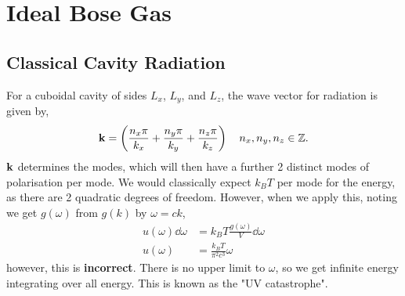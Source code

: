 \documentclass{book}
\begin{document}
\section{Ideal Bose Gas}
\subsection{Classical Cavity Radiation}
For a cuboidal cavity of sides $L_x$, $L_y$, and $L_z$, the wave vector for radiation is given by,
\begin{equation}
	\vb{k} = \left(\frac{n_x\pi}{k_x} + \frac{n_y\pi}{k_y} + \frac{n_z\pi}{k_z}\right) \hspace{1em} n_x,n_y,n_z \in \mathbb{Z}.
\end{equation}
$\vb{k}$ determines the modes, which will then have a further 2 distinct modes of polarisation per mode. We would classically expect $k_BT$ per mode for the energy, as there are 2 quadratic degrees of freedom. However, when we apply this, noting we get $g(\omega)$ from $g(k)$ by $\omega = ck$,
\begin{align}
	u(\omega)\dd{\omega} & = k_BT \frac{g(\omega)}{V}\dd{\omega}\\
	u(\omega) & = \frac{k_BT}{\pi^2c^3}\omega
\end{align}
however, this is \textbf{incorrect}. There is no upper limit to $\omega$, so we get infinite energy integrating over all energy. This is known as the "UV catastrophe".
\end{document}
